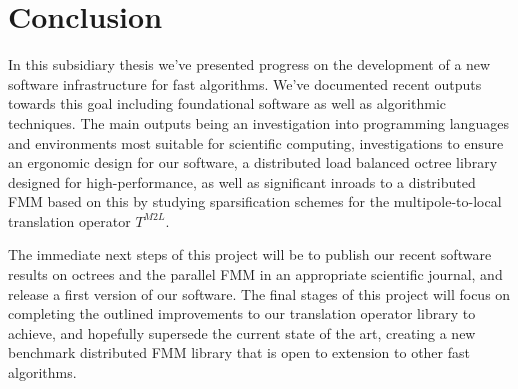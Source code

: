 \chapter{Conclusion}\label{chpt:conclusion}

In this subsidiary thesis we've presented progress on the development of a new software infrastructure for fast algorithms. We've documented recent outputs towards this goal including foundational software as well as algorithmic techniques. The main outputs being an investigation into programming languages and environments most suitable for scientific computing, investigations to ensure an ergonomic design for our software, a distributed load balanced octree library designed for high-performance, as well as significant inroads to a distributed FMM based on this by studying sparsification schemes for the multipole-to-local translation operator $T^{M2L}$.

The immediate next steps of this project will be to publish our recent software results on octrees and the parallel FMM in an appropriate scientific journal, and release a first version of our software. The final stages of this project will focus on completing the outlined improvements to our translation operator library to achieve, and hopefully supersede the current state of the art, creating a new benchmark distributed FMM library that is open to extension to other fast algorithms.